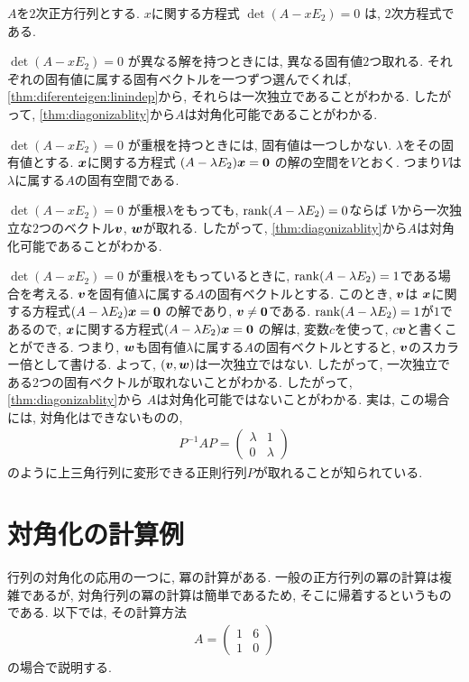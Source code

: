 \begin{remark}
  \label{rem:jordan}
  $A$を$2$次正方行列とする.
  $x$に関する方程式
  $\det(A-xE_2)=0$
  は, $2$次方程式である.
  
  $\det(A-xE_2)=0$
  が異なる解を持つときには,
  異なる固有値$2$つ取れる.
  それぞれの固有値に属する固有ベクトルを一つずつ選んでくれば,
  \cref{thm:diferenteigen:linindep}から,
  それらは一次独立であることがわかる.
  したがって,
  \cref{thm:diagonizablity}から$A$は対角化可能であることがわかる.

  $\det(A-xE_2)=0$
  が重根を持つときには,
  固有値は一つしかない.
  $\lambda$をその固有値とする.
  $\boldsymbol{x}$に関する方程式
  $(A-\lambda E_2)\boldsymbol{x}=\boldsymbol{0}$
  の解の空間を$V$とおく.
  つまり$V$は$\lambda$に属する$A$の固有空間である.

  $\det(A-xE_2)=0$
  が重根$\lambda$をもっても,
  $\operatorname{rank}(A-\lambda E_2)=0$ならば
  $V$から一次独立な$2$つのベクトル$\boldsymbol{v}$, $\boldsymbol{w}$が取れる.
  したがって,
  \cref{thm:diagonizablity}から$A$は対角化可能であることがわかる.

  $\det(A-xE_2)=0$
  が重根$\lambda$をもっているときに,
  $\operatorname{rank}(A-\lambda E_2)=1$である場合を考える.
  $\boldsymbol{v}$を固有値$\lambda$に属する$A$の固有ベクトルとする.
  このとき, $\boldsymbol{v}$は
  $\boldsymbol{x}$に関する方程式$(A-\lambda E_2)\boldsymbol{x}=\boldsymbol{0}$
  の解であり, $\boldsymbol{v}\neq \boldsymbol{0}$である.
  $\operatorname{rank}(A-\lambda E_2)=1$が$1$であるので,
  $\boldsymbol{x}$に関する方程式$(A-\lambda E_2)\boldsymbol{x}=\boldsymbol{0}$
  の解は, 変数$c$を使って, $c\boldsymbol{v}$と書くことができる.
  つまり, $\boldsymbol{w}$も固有値$\lambda$に属する$A$の固有ベクトルとすると,
  $\boldsymbol{v}$のスカラー倍として書ける.
  よって, $(\boldsymbol{v},\boldsymbol{w})$は一次独立ではない.
  したがって,
  一次独立である2つの固有ベクトルが取れないことがわかる.
  したがって,
  \cref{thm:diagonizablity}から
  $A$は対角化可能ではないことがわかる.
  実は, この場合には, 対角化はできないものの,
  \begin{align*}
    P^{-1}AP=\begin{pmatrix}\lambda&1\\0&\lambda \end{pmatrix}
  \end{align*}
  のように上三角行列に変形できる正則行列$P$が取れることが知られている.
\end{remark}


\section{対角化の計算例}
\label{ex:diagonalization}
行列の対角化の応用の一つに, 冪の計算がある.
一般の正方行列の冪の計算は複雑であるが,
対角行列の冪の計算は簡単であるため,
そこに帰着するというものである.
以下では,
その計算方法
\begin{align*}
A=\begin{pmatrix}1&6\\1&0\end{pmatrix}
\end{align*}
の場合で説明する.

